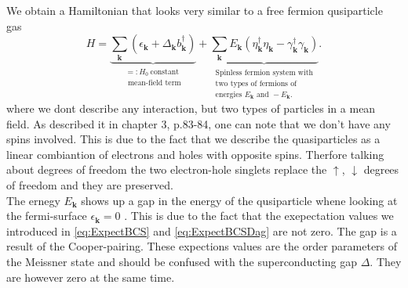 \documentclass[../main.tex]{subfile}
\begin{document}
We obtain a Hamiltonian that looks very similar to a free fermion qusiparticle gas 
\[
H = \underbrace{\sum_{\bm{k}} \left(\epsilon_{\bm{k}} + \Delta_{\bm{k}} b_{\bm{k}}^{\dagger}\right)}_{\substack{=:H_0~ \text{constant}\\\text{ mean-field term}}}  + \underbrace{\sum_{\bm{k}} E_{\bm{k}}\left(\eta_{\bm{k}}^{\dagger}\eta_{\bm{k}} - \gamma_{\bm{k}}^{\dagger}\gamma_{\bm{k}}\right)}_{\substack{\text{Spinless fermion system with} \\\text{two types of fermions of}\\\text{energies }E_{\bm{k}}\text{ and }-E_{\bm{k}}.}}.
\]
where we dont describe any interaction, but two types of particles in a mean field. 
As \cite{FossheimSudbo2004} described it in chapter 3, p.83-84, one can note that we don't have any spins involved. This is due
to the fact that we describe the quasiparticles as a linear combiantion of electrons and holes with opposite spins. 
Therfore talking about degrees of freedom the two electron-hole singlets replace the $\uparrow$, $\downarrow$ degrees of freedom and they are preserved.\\

The ernegy $E_{\bm{k}}$ shows up a gap in the energy of the qusiparticle whene looking at the fermi-surface $\epsilon_{\bm{k}}=0$ .
This is due to the fact that the exepectation values we introduced in \ref{eq:ExpectBCS} and \ref{eq:ExpectBCSDag} are not zero. The gap is a result of the Cooper-pairing. These expections values
are the order parameters of the Meissner state and should be confused with the superconducting gap $\Delta$. They are however zero at the same time. \\
\end{document}
